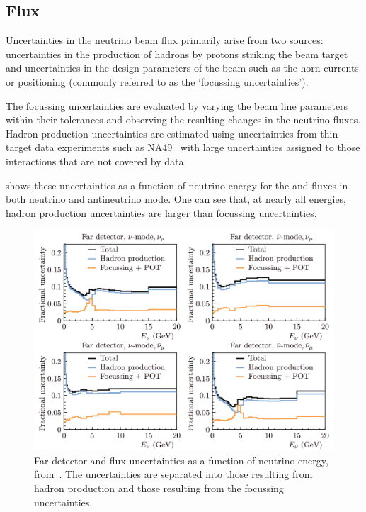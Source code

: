 \subsection{Flux}
\label{sec:dune_lbl:systs:flux}

Uncertainties in the neutrino beam flux primarily arise from two sources: uncertainties in the production of hadrons by protons striking the beam target and uncertainties in the design parameters of the beam such as the horn currents or positioning (commonly referred to as the `focussing uncertainties').

The focussing uncertainties are evaluated by varying the beam line parameters within their tolerances and observing the resulting changes in the neutrino fluxes.
Hadron production uncertainties are estimated using uncertainties from thin target data experiments such as NA49~\cite{na49} with large uncertainties assigned to those interactions that are not covered by data.

 shows these uncertainties as a function of neutrino energy for the \numu and \anumu fluxes in both neutrino and antineutrino mode.
One can see that, at nearly all energies, hadron production uncertainties are larger than focussing uncertainties.

\begin{figure}[h]
  \centering
  \includegraphics[width=.8\linewidth]{files/figures/dune_detector/fluxUncertainties}
  \caption[Far detector flux uncertainties for \numu and \anumu]{Far detector \numu and \anumu flux uncertainties as a function of neutrino energy, from~\cite{tdrVol2}. The uncertainties are separated into those resulting from hadron production and those resulting from the focussing uncertainties.}
  \label{fig:fluxUncertainties}
\end{figure}

